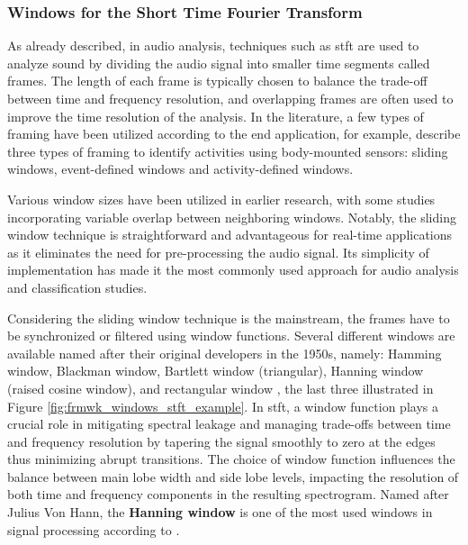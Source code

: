 \subsubsection{Windows for the Short Time Fourier Transform}
\label{subsubsec:audio_fundamentals_windowing_techniques}

As already described, in audio analysis, techniques such as \gls{stft} are used to analyze sound by dividing the audio signal into smaller time segments called frames.  The length of each frame is typically chosen to balance the trade-off between time and frequency resolution, and overlapping frames are often used to improve the time resolution of the analysis. In the literature, a few types of framing have been utilized according to the end application, for example, \textcite{Preece2009} describe three types of framing to identify activities using body-mounted sensors: sliding windows, event-defined windows and activity-defined windows.

 Various window sizes have been utilized in earlier research, with some studies incorporating variable overlap between neighboring windows. Notably, the sliding window technique is straightforward and advantageous for real-time applications as it eliminates the need for pre-processing the audio signal. Its simplicity of implementation has made it the most commonly used approach for audio analysis and classification studies.

Considering the sliding window technique is the mainstream, the frames have to be synchronized or filtered using window functions. Several different windows are available named after their original developers in the 1950s, namely: Hamming window, Blackman window, Bartlett window (triangular), Hanning window (raised cosine window), and rectangular window \cite{Smith2013}, the last three illustrated in Figure \ref{fig:frmwk_windows_stft_example}. In \gls{stft}, a window function plays a crucial role in mitigating spectral leakage and managing trade-offs between time and frequency resolution by tapering the signal smoothly to zero at the edges thus minimizing abrupt transitions. The choice of window function influences the balance between main lobe width and side lobe levels, impacting the resolution of both time and frequency components in the resulting spectrogram. Named after Julius Von Hann, the \textbf{Hanning window} is one of the most used windows in signal processing according to \textcite{Mueller2021}.

